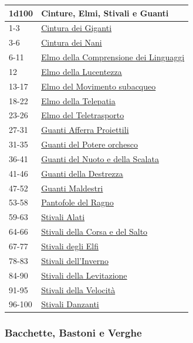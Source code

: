\begin{multicols}{2}
{{\small\begin{tabularx}{0.45\textwidth}{lX}
	\toprule
\textbf{1d100} & \textbf{Cinture, Elmi, Stivali e Guanti}\\
\toprule
1-3 & \hyperlink{CinturadeiGiganti}{Cintura dei Giganti}\\
3-6 & \hyperlink{CinturadeiNani}{Cintura dei Nani}\\
6-11 & \hyperlink{ElmodellaComprensionedeiLinguaggi}{Elmo della Comprensione dei Linguaggi}\\
12 & \hyperlink{ElmodellaLucentezza}{Elmo della Lucentezza}\\
13-17 & \hyperlink{ElmodelMovimentosubacqueo}{Elmo del Movimento subacqueo}\\
18-22 & \hyperlink{ElmodellaTelepatia}{Elmo della Telepatia}\\
23-26 & \hyperlink{ElmodelTeletrasporto}{Elmo del Teletrasporto}\\
27-31 & \hyperlink{GuantiAfferraProiettili}{Guanti Afferra Proiettili}\\
31-35 & \hyperlink{GuantidelPotereorchesco}{Guanti del Potere orchesco}\\
36-41 & \hyperlink{GuantidelNuotoedellaScalata}{Guanti del Nuoto e della Scalata}\\
41-46 & \hyperlink{GuantidellaDestrezza}{Guanti della Destrezza}\\
47-52 & \hyperlink{GuantiMaldestri}{Guanti Maldestri}\\
53-58 & \hyperlink{PantofoledelRagno}{Pantofole del Ragno}\\
59-63 & \hyperlink{StivaliAlati}{Stivali Alati}\\
64-66 & \hyperlink{StivalidellaCorsaedelSalto}{Stivali della Corsa e del Salto}\\
67-77 & \hyperlink{StivalidegliElfi}{Stivali degli Elfi}\\
78-83 & \hyperlink{Stivalidell'Inverno}{Stivali dell'Inverno}\\
84-90 & \hyperlink{StivalidellaLevitazione}{Stivali della Levitazione}\\
91-95 & \hyperlink{StivalidellaVelocità}{Stivali della Velocità}\\
96-100 & \hyperlink{StivaliDanzanti}{Stivali Danzanti}\\
\end{tabularx}}

\subsubsection{Bacchette, Bastoni e Verghe}\hypertarget{bastonibacchette}{}\label{bastonibacchette}

}
\end{multicols}
